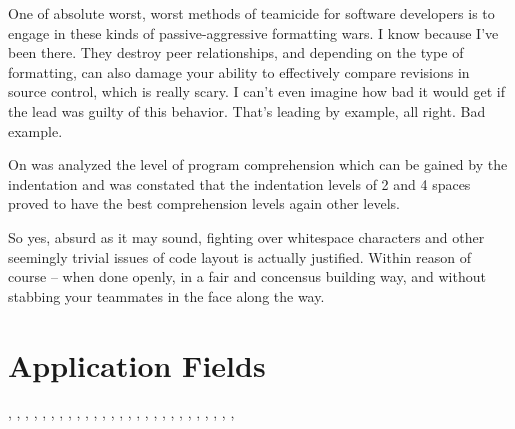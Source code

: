     \begin{citacao}
    One of absolute worst, worst methods of teamicide for software developers is to engage
    in these kinds of passive-aggressive formatting wars. I know because I've been there.
    They destroy peer relationships, and depending on the type of formatting, can also damage
    your ability to effectively compare revisions in source control, which is really scary.
    I can't even imagine how bad it would get if the lead was guilty of this behavior. That's
    leading by example, all right. Bad example. \cite{Atwood}
    \end{citacao}

    On  was analyzed the level of program
    comprehension which can be gained by the indentation and was constated that
    the indentation levels of 2 and 4 spaces proved to have the best
    comprehension levels again other levels.

    \begin{citacao}
    So yes, absurd as it may sound, fighting over whitespace characters and other seemingly
    trivial issues of code layout is actually justified. Within reason of course -- when done
    openly, in a fair and concensus building way, and without stabbing your teammates in the
    face along the way. \cite{Atwood}
    \end{citacao}



    \section{Application Fields}

    ,
    ,
    ,
    ,
    ,
    ,
    ,
    ,
    ,
    ,
    ,
    ,
    ,
    ,
    ,
    ,
    ,
    ,
    ,
    ,
    ,
    ,
    ,
    ,
    ,
    ,
    ,


